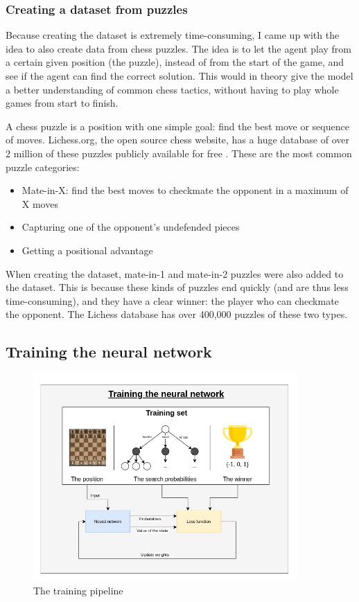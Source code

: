 \documentclass{article}
\begin{document}
\subsubsection{Creating a dataset from puzzles}

Because creating the dataset is extremely time-consuming, I came up with the idea to also
create data from chess puzzles. The idea is to let the agent play from a certain given position (the puzzle), 
instead of from the start of the game, and see if the agent can find the correct solution.
This would in theory give the model a better understanding of common chess tactics, without having to play
whole games from start to finish.

A chess puzzle is a position with one simple goal: find the best move or sequence of moves.
Lichess.org, the open source chess website, has a huge database of over 2 million of these puzzles publicly available for free \cite{LichessOrgOpen}. 
These are the most common puzzle categories:

\begin{itemize}
    \item Mate-in-X: find the best moves to checkmate the opponent in a maximum of X moves
    \item Capturing one of the opponent's undefended pieces
    \item Getting a positional advantage
\end{itemize}

When creating the dataset, mate-in-1 and mate-in-2 puzzles were also added to the dataset. This is because these kinds of puzzles
end quickly (and are thus less time-consuming), and they have a clear winner: the player who can checkmate the opponent.
The Lichess database has over 400,000 puzzles of these two types. 

\subsection{Training the neural network}

\begin{figure}[H]
    \centering
    \includegraphics[width=0.9\textwidth]{img/training.png}
    \caption{The training pipeline}
\end{figure}
\end{document}
